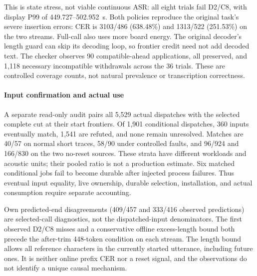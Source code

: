 This is state stress, not viable continuous ASR: all eight trials fail
D2/C8, with display P99 of 449.727--502.952~s. Both policies reproduce
the original task's severe insertion errors: CER is 3103/486 (638.48\%)
and 1313/522 (251.53\%) on the two streams. Full-call also uses more
board energy. The original decoder's length guard can skip its decoding
loop, so frontier credit need not add decoded text. The checker observes
90 compatible-ahead applications, all preserved, and 1,118 necessary
incompatible withdrawals across the 36 trials. These are controlled
coverage counts, not natural prevalence or transcription correctness.
\paragraph{Input confirmation and actual use}
A separate read-only audit pairs all 5,529 actual dispatches with the
selected complete cut at their start frontiers. Of 1,901 conditional
dispatches, 360 inputs eventually match, 1,541 are refuted, and none
remain unresolved. Matches are 40/57 on normal short traces, 58/90 under
controlled faults, and 96/924 and 166/830 on the two no-reset sources.
These strata have different workloads and acoustic units; their pooled
ratio is not a production estimate. Six matched conditional jobs fail
to become durable after injected process failures. Thus eventual input
equality, live ownership, durable selection, installation, and actual
consumption require separate accounting.

Own predicted-end disagreements (409/457 and 333/416 observed predictions)
are selected-call diagnostics, not the dispatched-input denominators.
The first observed D2/C8 misses and a conservative offline excess-length
bound both precede the after-trim 448-token condition on each stream.
The length bound allows all reference characters in the currently started
utterance, including future ones. It is neither online prefix CER nor a
reset signal, and the observations do not identify a unique causal mechanism.
